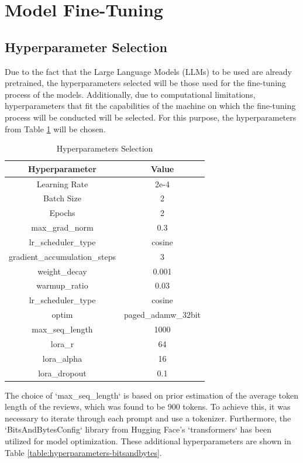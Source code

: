 \section{Model Fine-Tuning}
\subsection{Hyperparameter Selection}
Due to the fact that the Large Language Models (LLMs) to be used are already pretrained, the hyperparameters selected will be those used for the fine-tuning process of the models. Additionally, due to computational limitations, hyperparameters that fit the capabilities of the machine on which the fine-tuning process will be conducted will be selected. For this purpose, the hyperparameters from Table \ref{table:hyperparameters} will be chosen.
\begin{table}[H]
    \centering
    \begin{tabular}{|c|c|}
        \hline
        \textbf{Hyperparameter} & \textbf{Value} \\
        \hline
        Learning Rate & 2e-4 \\
        Batch Size & 2 \\
        Epochs & 2 \\
        max\_grad\_norm & 0.3 \\
        lr\_scheduler\_type & cosine\\
        gradient\_accumulation\_steps & 3 \\
        weight\_decay & 0.001 \\
        warmup\_ratio & 0.03 \\
        lr\_scheduler\_type & cosine \\
        optim & paged\_adamw\_32bit \\
        max\_seq\_length & 1000 \\
        lora\_r & 64 \\
        lora\_alpha & 16 \\
        lora\_dropout & 0.1\\
        \hline
    \end{tabular}
    \caption{Hyperparameters Selection}
    \label{table:hyperparameters}
\end{table}
The choice of `max\_seq\_length` is based on prior estimation of the average token length of the reviews, which was found to be 900 tokens. To achieve this, it was necessary to iterate through each prompt and use a tokenizer. Furthermore, the `BitsAndBytesConfig` library from Hugging Face's `transformers` has been utilized for model optimization. These additional hyperparameters are shown in Table \ref{table:hyperparameters-bitsandbytes}.
